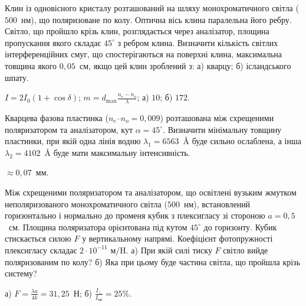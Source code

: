 \begin{problem}%
    Клин із одновісного кристалу розташований на шляху монохроматичного світла ($ 500 $~нм), що поляризоване по колу. Оптична вісь клина паралельна його ребру. Світло, що пройшло крізь клин, розглядається через аналізатор, площина пропускання якого складає $ 45^\circ $ з ребром клина. Визначити кількість світлих інтерференційних смуг, що спостерігаються на поверхні клина, максимальна товщина якого $ 0,05 $~см, якщо цей клин зроблений з: а) кварцу; б) ісландського шпату.
    \begin{solution}
        $ I = 2I_0(1 + \cos\delta) $; $ m = d_{\max} \frac{n_e - n_o}{\lambda} $; а) $ 10 $; б) $ 172 $.
    \end{solution}
\end{problem}


\begin{problem}%
    Кварцева фазова пластинка ($ n_e – n_o = 0,009 $) розташована між схрещеними поляризатором та аналізатором, кут $ \alpha = 45^\circ $. Визначити мінімальну товщину пластинки, при якій одна лінія водню $ \lambda_1 = 6563 $~\AA{} буде сильно ослаблена, а інша $\lambda_2 = 4102$~\AA{} буде мати максимальну інтенсивність.
    \begin{solution}
        $ \approx 0,07  $~мм.
    \end{solution}
\end{problem}

\begin{problem}\label{prb:4.41}%
    Між схрещеними поляризатором та аналізатором, що освітлені вузьким жмутком неполяризованого монохроматичного світла ($ 500 $~нм), встановлений горизонтально і нормально до променя кубик з плексигласу зі стороною $ a = 0,5 $~см. Площина поляризатора орієнтована під кутом $ 45^\circ $ до горизонту. Кубик стискається силою $ F $ у вертикальному напрямі. Коефіцієнт фотопружності плексигласу складає $ 2\cdot10^{-11} $ м/H. а) При якій силі тиску $ F $ світло вийде поляризованим по колу? б) Яка при цьому буде частина світла, що пройшла крізь систему?
    \begin{solution}
        а) $ F = \frac{\lambda a}{4k} = 31,25 $~Н; б) $ \frac{I_\perp}{I_\text{пр}} = 25\% $.
    \end{solution}
\end{problem}


